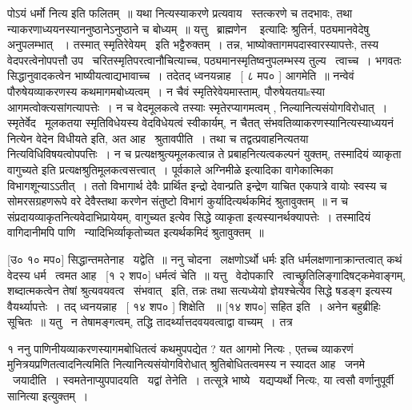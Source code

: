 \documentclass[11pt, openany]{book}
\begin{document}
पोऽयं धर्मो नित्य इति फलितम्~॥ यथा नित्यस्याकरणे प्रत्यवाय \textendash\ 
स्तत्करणे च तदभावः, तथा न्याकरणाध्ययनस्याननुष्ठानेऽनुष्ठाने च बोध्यम्~॥
यत्तु \textendash\ {\qt ब्राह्मणेन \textendash\ } इत्यादिः श्रुतिर्न, पठ्यमानवेदेषु अनुपलम्भात्
~। तस्मात् स्मृतिरेवेयम् \textendash\ इति भट्टैरुक्तम्~। तन्न,
भाष्योक्तागमपदास्वारस्यापत्तेः, तस्य वेदपरत्वेनोपपत्तौ उप \textendash\ 
चरितस्मृतिपरत्वानौचित्याच्च, पठ्यमानस्मृतिष्वनुपलम्भस्य तुल्य \textendash\ त्वाच्च~। 
भगवतः सिद्धानुवादकत्वेन भाष्यीयत्वाद्यभावाच्च~। तदेतद् ध्वनयन्नाह \textendash\ [ ८
मप० ] आगमेति~॥ नन्वेवं पौरुषेयव्याकरणस्य कथमागमबोध्यत्वम्~। न
चैवं स्मृतिरेवेयमास्ताम्, पौरुषेयतयाsस्या आगमत्वोक्त्यसांगत्यापत्तेः~। न
च वेदमूलकत्वे तस्याः स्मृतेरप्यागमत्वम् , निल्यानित्यसंयोगविरोधात्~। 
स्मृतेर्वेद \textendash\ मूलकतया स्मृतिविधेयस्य वेदविधेयत्वं स्वीकार्यम्, न चैतत्
संभवतिव्याकरणस्यानित्यस्याध्ययनं नित्येन वेदेन विधीयते इति, अत आह \textendash\ 
श्रुतावपीति~। तथा च तद्वत्प्रवाहनित्यतया नित्यविधिविषयत्वोपपत्तिः~। 
न च प्रत्यक्षश्रुत्यमूलकत्वान्न ते प्रबाहनित्यत्वकल्पनं युक्तम्,
{\qt तस्मादियं व्याकृता वागुच्यते} इति प्रत्यक्षश्रुतिमूलकत्वसत्त्वात्~। 
पूर्वकाले {\qt अग्निमीळे} इत्यादिका वागेकात्मिका विभागशून्याऽऽतीत्~। 
ततो विभागार्थ देवैः प्रार्थित इन्द्रो देवान्प्रति इन्द्रेण याचित
एकपात्रे वायोः स्वस्य च सोमरसग्रहणरूपे वरे देवैस्तथा करणेन संतुष्टो
विभागं कुर्यादित्यर्थकमिदं श्रुतावुक्तम्~॥ न च
संप्रदायव्याकृतनित्यवेदाभिप्रायेयम्, वागुच्यत इत्येव सिद्धे व्याकृता
इत्यस्यानर्थक्यापत्तेः~। तस्मादियं वागिदानीमपि
पाणि \textendash\ न्यादिभिर्व्याकृतोच्यत इत्यर्थकमिदं श्रुतावुक्तम्~॥ 

 [उ० १० मप०] सिद्धान्तमतेनाह \textendash\ यद्वेति~॥ ननु {\qt चोदना} \textendash\ लक्षणोऽर्थो
धर्मः इति धर्मलक्षणानाक्रान्तत्वात् कथं वेदस्य धर्म \textendash\ त्वमत आह \textendash\ [१ २
शप०] धर्मत्वं चेति~॥ यत्तु \textendash\ वेदोपकारि \textendash\ 
त्वाच्छ्रुतिलिङ्गादिषट्कमेवाङ्गम्, शब्दात्मकत्वेन तेषां
श्रुत्यवयवत्व \textendash\ संभवात् \textendash\ इति, तन्नः तथा सत्यध्येयो ज्ञेयश्चेत्येव सिद्धे
षडङ्ग इत्यस्य वैयर्थ्यापत्तेः~। तद् ध्वनयन्नाह \textendash\ [ १४ शप० ] शिक्षेति
~॥ [१४ शप०] सहित इति~। अनेन बहुब्रीहिः सूचितः~॥ यतु \textendash\ न
तेषामङ्गत्वम्, तद्धि तादर्थ्यात्तदवयवत्वाद्वा वाच्यम्~। तत्र 



१ ननु पाणिनीयव्याकरणस्यागमबोधितत्वं कथमुपपद्येत ? यत आगमो नित्यः ,
एतच्च व्याकरणं मुनित्रयप्रणितत्वादनित्यमिति नित्यानित्यसंयोगविरोधात्
श्रुतिबोधितत्वमस्य न स्यादत आह \textendash\ जनमे \textendash\ जयादीति~। 
स्वमतेनाप्युपपादयति \textendash\ यद्वां तेनेति~। तत्सूत्रे भाष्ये \textendash\ यद्यप्यर्थो
नित्यः, या त्वसौ {\qt वर्णानुपूर्वी सानित्या} इत्युक्तम्~। 
\end{document}
